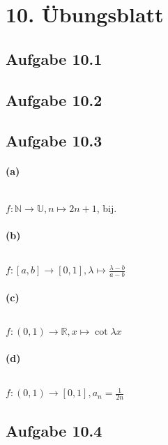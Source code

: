 \section{10. Übungsblatt}

\subsection{Aufgabe 10.1}

\subsection{Aufgabe 10.2}

\newpage

\subsection{Aufgabe 10.3}

\paragraph{(a)}
$ $\newline

$f:\mathbb{N}\rightarrow\mathbb{U},n\mapsto 2n+1$, bij.

\paragraph{(b)}
$ $\newline

$f:[a,b]\rightarrow[0,1],\lambda\mapsto\frac{\lambda-b}{a-b}$

\paragraph{(c)}
$ $\newline

$f:(0,1)\rightarrow\mathbb{R},x\mapsto\cot\lambda x$

\paragraph{(d)}
$ $\newline

$f:(0,1)\rightarrow[0,1],a_n=\frac{1}{2n}$

\newpage

\subsection{Aufgabe 10.4}

